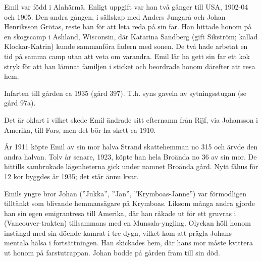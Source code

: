 Emil var född i Alahärmä. Enligt uppgift var han två gånger till USA, 1902-04 och 1905. Den andra gången, i sällskap med Anders Jungarå och Johan Henriksson Grötas, reste han för att leta reda på sin far. Han hittade honom på en skogscamp i Ashland, Wisconsin, där Katarina Sandberg (gift Sikström; kallad Klockar-Katrin) kunde sammanföra fadern med sonen. De två hade arbetat en tid på samma camp utan att veta om varandra. Emil lär ha gett sin far ett kok stryk för att han lämnat familjen i sticket och beordrade honom därefter att resa hem.

Infarten till gården ca 1935 (gård 397). T.h.  syns gaveln av sytningsstugan (se gård 97a).

Det är oklart i vilket skede Emil ändrade sitt efternamn från Rijf, via Johansson i Amerika, till Fors, men det bör ha skett ca 1910.

År 1911 köpte Emil av sin mor halva Strand skattehemman no 315 och ärvde den andra halvan. Tolv år senare, 1923, köpte han hela Broända no 36 av sin mor. De hittills sambrukade lägenheterna gick under namnet Broända gård. Nytt fähus för 12 kor byggdes år 1935; det står ännu kvar.

Emils yngre bror Johan (”Jukka”, ”Jan”, ”Krymboas-Janne”) var förmodligen tilltänkt som blivande hemmansägare på Krymboas. Liksom många andra gjorde han sin egen emigrantresa till Amerika, där han råkade ut för ett gruvras i (Vancouver-trakten) tillsammans med en Munsala-yngling. Olyckan höll honom instängd med sin döende kamrat i tre dygn, vilket kom att prägla Johans mentala hälsa i fortsättningen. Han skickades hem, där hans mor måste kvittera ut honom på farstutrappan. Johan bodde på gården fram till sin död.




